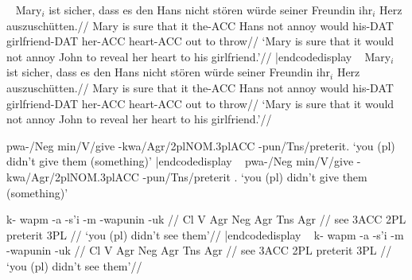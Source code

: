 %
\vfil\eject
{}
\medskip
{}

\codedisplay~
\ex
\begingl[glstyle=wrap]
\gla Mary$_i$ ist sicher, dass es den Hans nicht st\"oren
w\"urde seiner Freundin ihr$_i$ Herz auszusch\"utten.//
\glb Mary is sure that it the-ACC Hans not annoy would
his-DAT girlfriend-DAT her-ACC heart-ACC {out to throw}//
\glft  `Mary is sure that it would not annoy John to reveal her
heart to his girlfriend.'//
\endgl
\xe|endcodedisplay
\framedisplay~
\ex
\begingl[glstyle=wrap]
\gla Mary$_i$ ist sicher, dass es den Hans nicht st\"oren
w\"urde seiner Freundin ihr$_i$ Herz auszusch\"utten.//
\glb Mary is sure that it the-ACC Hans not annoy would
his-DAT girlfriend-DAT her-ACC heart-ACC {out to throw}//
\glft  `Mary is sure that it would not annoy John to reveal her
heart to his girlfriend.'//
\endgl
\xe\endframedisplay

\codedisplay
\ex[glstyle=3level]
\begingl
{pwa-/Neg} {min/V/give} {-kwa/Agr/2pl{\sc NOM}.3pl{\sc ACC}}
{-pun/Tns/preterit}.
`you (pl) didn't give them (something)'
\endgl
\xe |endcodedisplay
\framedisplay~
\ex[glstyle=3level]
\begingl
{pwa-/Neg} {min/V/give} {-kwa/Agr/2pl{\sc NOM}.3pl{\sc ACC}}
{-pun/Tns/preterit} .
`you (pl) didn't give them (something)'
\endgl
\xe
\endframedisplay

\vfil\eject
\codedisplay
\ex[glstyle=multilevel]
\begingl
\gla k- wapm -a -s'i -m -wapunin -uk //
\glb Cl V Agr Neg Agr Tns Agr //
 see {3\sc ACC} {} 2{\sc PL} preterit 3{\sc PL} //
\glft `you (pl) didn't see them'//
\endgl
\xe|endcodedisplay
\framedisplay~
\ex[glstyle=multilevel]
\begingl
\gla k- wapm -a -s'i -m -wapunin -uk //
\glb Cl V Agr Neg Agr Tns Agr //
 see {3\sc ACC} {} 2{\sc PL} preterit 3{\sc PL} //
\glft `you (pl) didn't see them'//
\endgl
\xe
\endframedisplay

